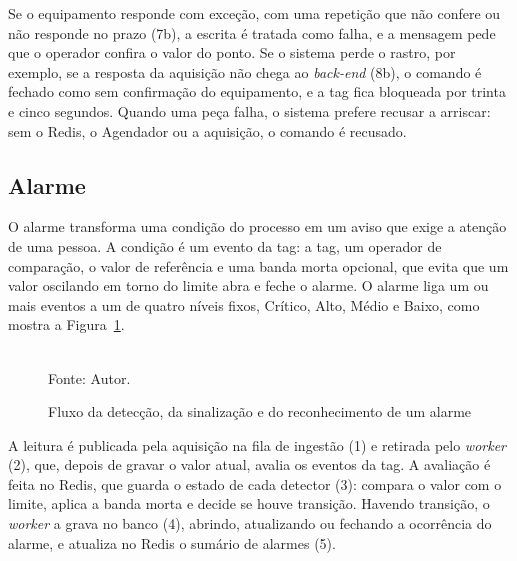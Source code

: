 \par Se o equipamento responde com exceção, com uma repetição que não confere ou não responde no prazo (7b), a escrita é tratada como falha, e a mensagem pede que o operador confira o valor do ponto. Se o sistema perde o rastro, por exemplo, se a resposta da aquisição não chega ao \emph{back-end} (8b), o comando é fechado como sem confirmação do equipamento, e a tag fica bloqueada por trinta e cinco segundos. Quando uma peça falha, o sistema prefere recusar a arriscar: sem o Redis, o Agendador ou a aquisição, o comando é recusado.

\subsection{Alarme}

\par O alarme transforma uma condição do processo em um aviso que exige a atenção de uma pessoa. A condição é um evento da tag: a tag, um operador de comparação, o valor de referência e uma banda morta opcional, que evita que um valor oscilando em torno do limite abra e feche o alarme. O alarme liga um ou mais eventos a um de quatro níveis fixos, Crítico, Alto, Médio e Baixo, como mostra a Figura~\ref{fig:fx_alarme}.

\begin{figure}[H]
    \centering
    \caption{Fluxo da detecção, da sinalização e do reconhecimento de um alarme}
    \label{fig:fx_alarme}
    \vspace{0.4cm}
    \vspace{0.2cm} \\
    Fonte: Autor.
\end{figure}

\par A leitura é publicada pela aquisição na fila de ingestão (1) e retirada pelo \emph{worker} (2), que, depois de gravar o valor atual, avalia os eventos da tag. A avaliação é feita no Redis, que guarda o estado de cada detector (3): compara o valor com o limite, aplica a banda morta e decide se houve transição. Havendo transição, o \emph{worker} a grava no banco (4), abrindo, atualizando ou fechando a ocorrência do alarme, e atualiza no Redis o sumário de alarmes (5).

